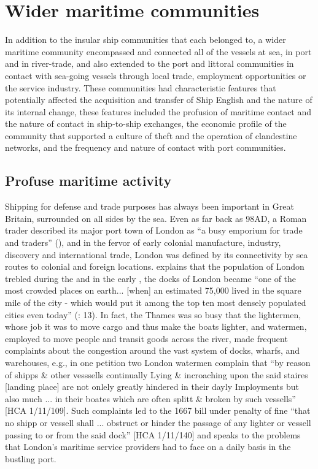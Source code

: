 \section{{Wider maritime communities}}\label{sec:4.3}

In addition to the insular ship communities that each  belonged to, a wider maritime community encompassed and connected all of the vessels at sea, in port and in river-trade, and also extended to the port and littoral communities in contact with sea-going vessels through local trade, employment opportunities or the service industry. These communities had characteristic features that potentially affected the acquisition and transfer of Ship English and the nature of its internal change, these features included the profusion of maritime contact and the nature of contact in ship-to-ship exchanges, the economic profile of the community that supported a culture of theft and the operation of clandestine networks, and the frequency and nature of contact with port communities. 

\subsection{{Profuse maritime activity}}\label{sec:4.3.1}

Shipping for defense and trade purposes has always been important in Great Britain, surrounded on all sides by the sea. Even as far back as 98AD, a Roman trader described its major port town of London as “a busy emporium for trade and traders” (\citealt{Tacitus1913}), and in the fervor of early colonial manufacture, industry, discovery and international trade, London was defined by its connectivity by sea routes to colonial and foreign locations. \citeauthor{Bicheno2012} explains that the population of London trebled during the  and in the early , the docks of London became “one of the most crowded places on earth... [when] an estimated 75,000 lived in the square mile of the city - which would put it among the top ten most densely populated cities even today” (\citealt{Bicheno2012}: 13). In fact, the Thames was so busy that the lightermen, whose job it was to move cargo and thus make the boats lighter, and watermen, employed to move people and transit goods across the river, made frequent complaints about the congestion around the vast system of docks, wharfs, and warehouses, e.g., in one petition two London watermen complain that “by reason of shipps \& other vesssells continually Lying \& incroaching upon the said staires [landing place] are not onlely greatly hindered in their dayly Imployments but also much ... in their boates which are often splitt \& broken by such vessells” [HCA 1/11/109].  Such complaints led to the 1667 bill under penalty of fine “that no shipp or vessell shall ... obstruct or hinder the passage of any lighter or vessell passing to or from the said dock” [HCA 1/11/140] and speaks to the problems that London’s maritime service providers had to face on a daily basis in the bustling port. 

